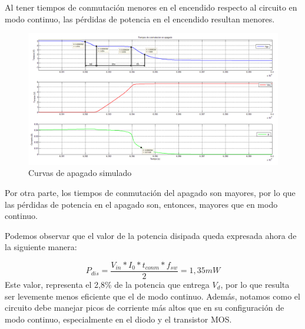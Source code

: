 \documentclass[e4_tp1_main.tex]{subfiles}
\begin{document}
Al tener tiempos de conmutación menores en el encendido respecto al circuito en modo continuo, las pérdidas de potencia en el encendido resultan menores.

\begin{figure}[H]
\centering
\includegraphics[width=0.9\linewidth]{Imagenes/Punto4/tiempos_apagadoX.png}
\caption{Curvas de apagado simulado}
\end{figure}

Por otra parte, los tiempos de conmutación del apagado son mayores, por lo que las pérdidas de potencia en el apagado son, entonces, mayores que en modo continuo.\par
Podemos observar que el valor de la potencia disipada queda expresada ahora de la siguiente manera:\par
\[ P_{dis} = \frac{V_{in}*I_0*t_{conm}*f_{sw}}{2} = 1,35 mW  \] 
Este valor, representa el 2,8\% de la potencia que entrega $V_d$, por lo que resulta ser levemente menos eficiente que el de modo continuo. Además, notamos como el circuito debe manejar picos de corriente más altos que en su configuración de modo continuo, especialmente en el diodo y el transistor MOS.

\newpage
\end{document}
